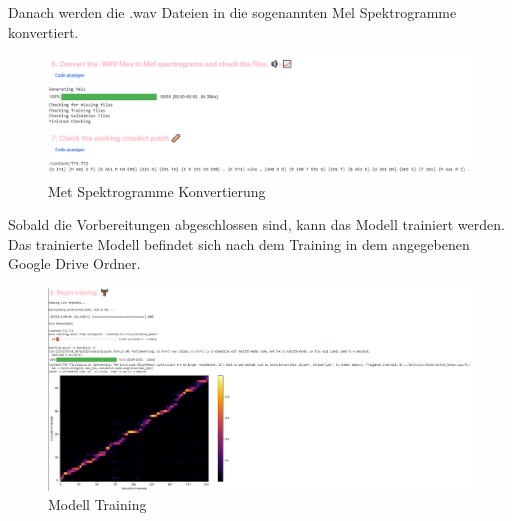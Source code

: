 Danach werden die .wav Dateien in die sogenannten Mel Spektrogramme konvertiert.
\begin{figure}[H]
    \includegraphics[width=1.0\textwidth]{Bilder/AudioTraining4}
    \centering
    \caption{Met Spektrogramme Konvertierung}
    \label{fig:TrainingPart4}
\end{figure}
Sobald die Vorbereitungen abgeschlossen sind, kann das Modell trainiert werden. Das trainierte Modell befindet sich nach dem Training in dem angegebenen Google Drive Ordner.
\begin{figure}[H]
    \includegraphics[width=1.0\textwidth]{Bilder/AudioTraining5}
    \centering
    \caption{Modell Training}
    \label{fig:TrainingPart5}
\end{figure}
